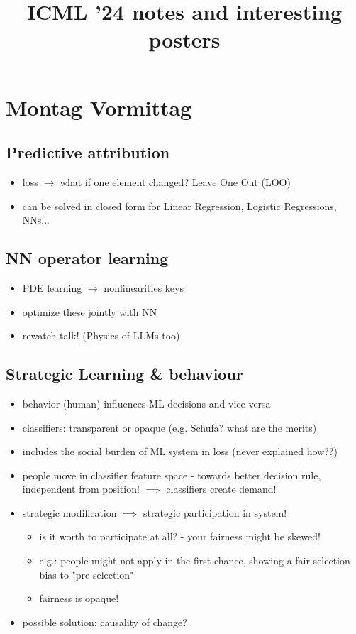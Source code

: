 \documentclass[a4paper]{article}
\title{ICML '24 notes and interesting posters}
\begin{document}
\maketitle

\section*{Montag Vormittag}
\subsection*{Predictive attribution}
\begin{itemize}
    \item loss $\rightarrow$ what if one element changed? Leave One Out (LOO)
    \item can be solved in closed form for Linear Regression, Logistic Regressions, NNs,..
\end{itemize}
\subsection*{NN operator learning}
\begin{itemize}
    \item PDE learning $\rightarrow$ nonlinearities keys
    \item optimize these jointly with NN
    \item rewatch talk! (Physics of LLMs too)
\end{itemize}
\subsection*{Strategic Learning \& behaviour}
\begin{itemize}
    \item behavior (human) influences ML decisions and vice-versa
    \item classifiers: transparent or opaque (e.g. Schufa? what are the merits)
    \item includes the social burden of ML system in loss (never explained how??)
    \item people move in classifier feature space - towards better decision rule, independent from position! $\implies$ classifiers create demand!
    \item strategic modification $\implies$ strategic participation in system!
          \begin{itemize}
              \item is it worth to participate at all? - your fairness might be skewed!
              \item e.g.: people might not apply in the first chance, showing a fair selection bias to "pre-selection"
              \item fairness is opaque!
          \end{itemize}
    \item possible solution: causality of change?
\end{itemize}
\end{document}
